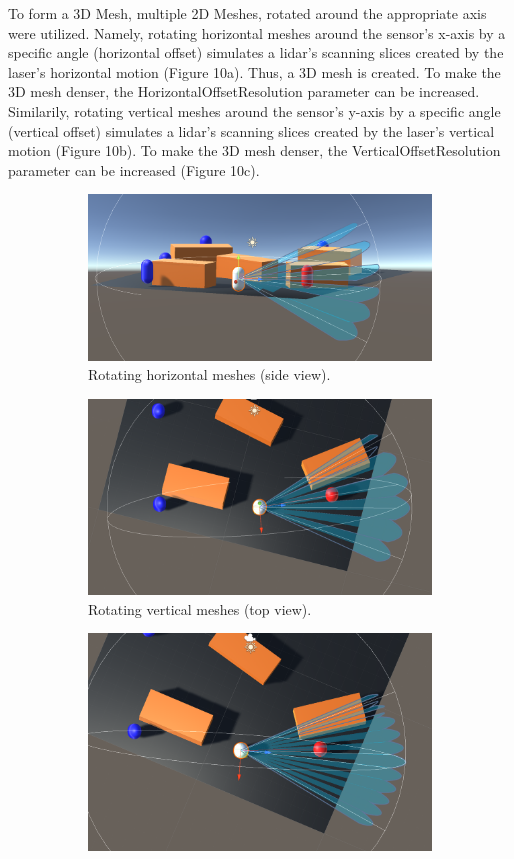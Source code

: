 \documentclass{article}
\begin{document}
To form a 3D Mesh, multiple 2D Meshes, rotated around the appropriate axis were utilized. Namely, rotating horizontal meshes around the sensor's x-axis by a specific angle (horizontal offset) simulates a lidar's scanning slices created by the laser's horizontal motion (Figure 10a). Thus, a 3D mesh is created. To make the 3D mesh denser, the HorizontalOffsetResolution parameter can be increased. Similarily, rotating vertical meshes around the sensor's y-axis by a specific angle (vertical offset)  simulates a lidar's scanning slices created by the laser's vertical motion (Figure 10b).  To make the 3D mesh denser, the VerticalOffsetResolution parameter can be increased (Figure 10c).

\begin{figure}
\centering
\begin{subfigure}[b]{1\textwidth}
   \centering
   \includegraphics[width=0.8\linewidth]{FOV(11).png}
   \caption{Rotating horizontal meshes (side view).}
\end{subfigure}
\begin{subfigure}[b]{1\textwidth}
   \centering
   \includegraphics[width=0.8\linewidth]{FOV(12).png}
   \caption{Rotating vertical meshes (top view).}
\end{subfigure}
\begin{subfigure}[c]{1\textwidth}
   \centering
   \includegraphics[width=0.8\linewidth]{FOV(13).png}

\end{subfigure}
\end{figure}
\end{document}
